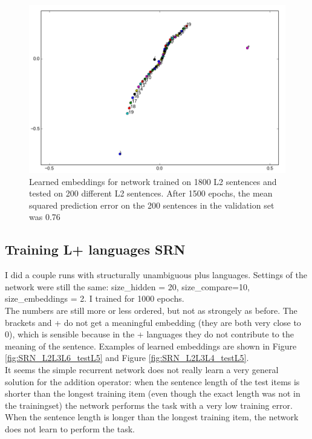 \documentclass{article}
\begin{document}
\begin{figure}[!ht]
        \includegraphics[scale=0.5]{L2_embeddings2.png}
        \caption{Learned embeddings for network trained on 1800 L2 sentences and tested on 200 different L2 sentences. After 1500 epochs, the mean squared prediction error on the 200 sentences in the validation set was 0.76}\label{fig:L3_embeddings2}
\end{figure}

\subsection{Training L+ languages SRN}

I did a couple runs with structurally unambiguous plus languages. 
Settings of the network were still the same: size\_hidden = 20, size\_compare=10, size\_embeddings = 2. 
I trained for 1000 epochs.\\

The numbers are still more or less ordered, but not as strongely as before. 
The brackets and + do not get a meaningful embedding (they are both very close to 0), which is sensible because in the + languages they do not contribute to the meaning of the sentence.
Examples of learned embeddings are shown in Figure \ref{fig:SRN_L2L3L6_testL5} and Figure \ref{fig:SRN_L2L3L4_testL5}.\\

It seems the simple recurrent network does not really learn a very general solution for the addition operator: when the sentence length of the test items is shorter than the longest training item (even though the exact length was not in the trainingset) the network performs the task with a very low training error. 
When the sentence length is longer than the longest training item, the network does not learn to perform the task.
\end{document}
